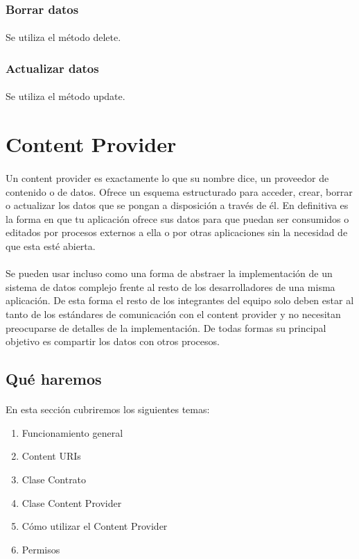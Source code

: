 \documentclass[10pt]{extarticle}
\begin{document}
\subsubsection{Borrar datos}
\paragraph{}
Se utiliza el método delete.

\subsubsection{Actualizar datos}
\paragraph{}
Se utiliza el método update.


\section{Content Provider}

\paragraph{}
Un content provider es exactamente lo que su nombre dice, un proveedor de contenido o de datos. Ofrece un esquema estructurado para acceder, crear, borrar o actualizar los datos que se pongan a disposición a través de él. En definitiva es la forma en que tu aplicación ofrece sus datos para que puedan ser consumidos o editados por procesos externos a ella o por otras aplicaciones sin la necesidad de que esta esté abierta.

\paragraph{}
Se pueden usar incluso como una forma de abstraer la implementación de un sistema de datos complejo frente al resto de los desarrolladores de una misma aplicación. De esta forma el resto de los integrantes del equipo solo deben estar al tanto de los estándares de comunicación con el content provider y no necesitan preocuparse de detalles de la implementación. De todas formas su principal objetivo es compartir los datos con otros procesos.

\subsection{Qué haremos}
\paragraph{}
En esta sección cubriremos los siguientes temas:
\begin{enumerate}
	\item Funcionamiento general
	\item Content URIs
	\item Clase Contrato
	\item Clase Content Provider
	\item Cómo utilizar el Content Provider
	\item Permisos
\end{enumerate}
\end{document}
